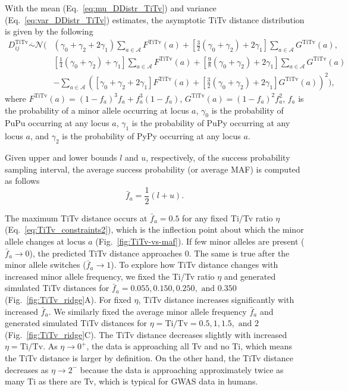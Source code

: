 \documentclass[10pt,letterpaper]{article}
\begin{document}
With the mean (Eq.~\ref{eq:mu_DDistr_TiTv}) and variance (Eq.~\ref{eq:var_DDistr_TiTv}) estimates, the asymptotic TiTv distance distribution is given by the following
%
\begin{equation}\label{eq:DDistr_TiTv}
\begin{aligned}
D^\text{TiTv}_{ij} \overset{.}{\sim} \mathcal{N}\Biggl(& (\gamma_0 + \gamma_2 + 2\gamma_1) \sum_{a \in \mathcal{A}} F^\text{TiTv}(a) + \left[\frac{3}{2}(\gamma_0 + \gamma_2) + 2\gamma_1\right] \sum_{a \in \mathcal{A}} G^\text{TiTv}(a), \\
&\left[\frac{1}{4}(\gamma_0 + \gamma_2) + \gamma_1\right] \sum_{a \in \mathcal{A}} F^\text{TiTv}(a) + \left[\frac{9}{8}(\gamma_0 + \gamma_2) + 2\gamma_1\right] \sum_{a \in \mathcal{A}} G^\text{TiTv}(a) \\
&- \sum_{a \in \mathcal{A}} \left([\gamma_0 + \gamma_2 + 2\gamma_1] F^\text{TiTv}(a) + \left[\frac{3}{2}(\gamma_0 + \gamma_2) + 2\gamma_1\right] G^\text{TiTv}(a)\right)^2\Biggr),
\end{aligned}
\end{equation}
%
where $F^\text{TiTv}(a) = (1 - f_a)^3 f_a + f^3_a (1 - f_a)$, $G^\text{TiTv}(a) = (1 - f_a)^2 f^2_a$, $f_a$ is the probability of a minor allele occurring at locus $a$, $\gamma_0$ is the probability of PuPu occurring at any locus $a$, $\gamma_1$ is the probability of PuPy occurring at any locus $a$, and $\gamma_2$ is the probability of PyPy occurring at any locus $a$.

Given upper and lower bounds $l$ and $u$, respectively, of the success probability sampling interval, the average success probability (or average MAF) is computed as follows
%
\begin{equation}\label{eq:avg_maf}
\bar{f}_a = \frac{1}{2}(l + u).
\end{equation}

The maximum TiTv distance occurs at $\bar{f}_a=0.5$ for any fixed Ti/Tv ratio $\eta$ (Eq.~\ref{eq:TiTv_constraints2}), which is the inflection point about which the minor allele changes at locus $a$ (Fig.~\ref{fig:TiTv-vs-maf}). If few minor alleles are present ($\bar{f}_a \to 0$), the predicted TiTv distance approaches 0. The same is true after the minor allele switches ($\bar{f}_a \to 1$). To explore how TiTv distance changes with increased minor allele frequency, we fixed the Ti/Tv ratio $\eta$ and generated simulated TiTv distances for $\bar{f}_a = 0.055, 0.150, 0.250, \text{ and } 0.350$ (Fig.~\ref{fig:TiTv_ridge}A). For fixed $\eta$, TiTv distance increases significantly with increased $\bar{f}_a$. We similarly fixed the average minor allele frequency $\bar{f}_a$ and generated simulated TiTv distances for $\eta = \text{Ti/Tv} = 0.5, 1, 1.5, \text{ and } 2$ (Fig.~\ref{fig:TiTv_ridge}C). The TiTv distance decreases slightly with increased $\eta = \text{Ti/Tv}$. As $\eta \to 0^+$, the data is approaching all Tv and no Ti, which means the TiTv distance is larger by definition. On the other hand, the TiTv distance decreases as $\eta \to 2^-$ because the data is approaching approximately twice as many Ti as there are Tv, which is typical for GWAS data in humans.
\end{document}
